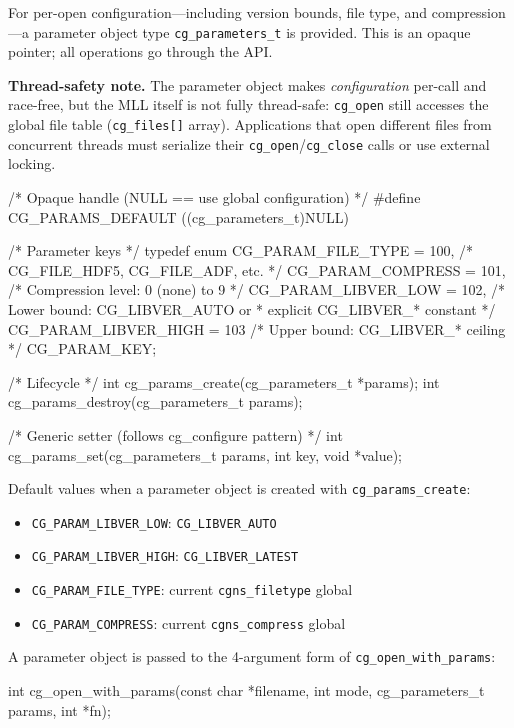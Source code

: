 \documentclass[11pt,letterpaper]{article}
\makeatletter
\let\cgns@orig@lstlisting\lstlisting
\let\cgns@endorig@lstlisting\endlstlisting
\renewenvironment{lstlisting}
  {\par\needspace{5\baselineskip}\nolinenumbers\cgns@orig@lstlisting}
  {\cgns@endorig@lstlisting\par\linenumbers}
\makeatother
\begin{document}
For per-open configuration---including version bounds,
file type, and compression---a parameter object type
\texttt{cg\_parameters\_t} is provided.  This is an opaque pointer;
all operations go through the API.

\textbf{Thread-safety note.}  The parameter object makes
\emph{configuration} per-call and race-free, but the MLL itself is
not fully thread-safe: \texttt{cg\_open} still accesses the global
file table (\texttt{cg\_files[]} array).  Applications that open
different files from concurrent threads must serialize their
\texttt{cg\_open}/\texttt{cg\_close} calls or use external locking.

\begin{lstlisting}[language=C]
/* Opaque handle (NULL == use global configuration) */
#define CG_PARAMS_DEFAULT ((cg_parameters_t)NULL)

/* Parameter keys */
typedef enum {
    CG_PARAM_FILE_TYPE    = 100, /* CG_FILE_HDF5, CG_FILE_ADF, etc. */
    CG_PARAM_COMPRESS     = 101, /* Compression level: 0 (none) to 9 */
    CG_PARAM_LIBVER_LOW   = 102, /* Lower bound: CG_LIBVER_AUTO or
                                  * explicit CG_LIBVER_* constant */
    CG_PARAM_LIBVER_HIGH  = 103  /* Upper bound: CG_LIBVER_* ceiling */
} CG_PARAM_KEY;

/* Lifecycle */
int cg_params_create(cg_parameters_t *params);
int cg_params_destroy(cg_parameters_t  params);

/* Generic setter (follows cg_configure pattern) */
int cg_params_set(cg_parameters_t params, int key, void *value);
\end{lstlisting}

Default values when a parameter object is created with
\texttt{cg\_params\_create}:

\begin{itemize}[leftmargin=2em]
\item \texttt{CG\_PARAM\_LIBVER\_LOW}: \texttt{CG\_LIBVER\_AUTO}
\item \texttt{CG\_PARAM\_LIBVER\_HIGH}: \texttt{CG\_LIBVER\_LATEST}
\item \texttt{CG\_PARAM\_FILE\_TYPE}: current \texttt{cgns\_filetype} global
\item \texttt{CG\_PARAM\_COMPRESS}: current \texttt{cgns\_compress} global
\end{itemize}

A parameter object is passed to the 4-argument form of
\texttt{cg\_open\_with\_params}:

\begin{lstlisting}[language=C]
int cg_open_with_params(const char     *filename,
                        int             mode,
                        cg_parameters_t params,
                        int            *fn);
\end{lstlisting}
\end{document}
